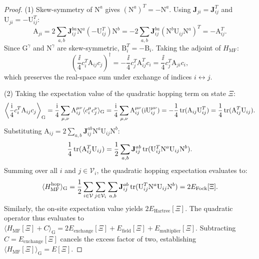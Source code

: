 \begin{proof}
(1) Skew-symmetry of $\mathrm{N}^a$ gives $(\mathrm{N}^a)^T = -\mathrm{N}^a$. Using $\mathbf{J}_{ji} = \mathbf{J}_{ij}^T$ and $\mathrm{U}_{ji} = -\mathrm{U}_{ij}^T$:
\begin{equation}
\mathrm{A}_{ji} = 2 \sum_{a,b} \mathbf{J}_{ij}^{ba} \mathrm{N}^a (-\mathrm{U}_{ij}^T) \mathrm{N}^b = -2 \sum_{a,b} \mathbf{J}_{ij}^{ba} (\mathrm{N}^b \mathrm{U}_{ij} \mathrm{N}^a)^T = -\mathrm{A}_{ij}^T.
\end{equation}
Since $\mathrm{G}^\gamma$ and $\mathrm{N}^\gamma$ are skew-symmetric, $\mathrm{B}_i^T = -\mathrm{B}_i$. Taking the adjoint of $H_{\mathrm{MF}}$:
\begin{equation}
\left( \frac{\ii}{4} c_i^T \mathrm{A}_{ij} c_j \right)^\dagger = -\frac{\ii}{4} c_j^T \mathrm{A}_{ij}^T c_i = \frac{\ii}{4} c_j^T \mathrm{A}_{ji} c_i,
\end{equation}
which preserves the real-space sum under exchange of indices $i \leftrightarrow j$.

(2) Taking the expectation value of the quadratic hopping term on state $\Xi$:
\begin{equation}
\left\langle \frac{\mathrm{i}}{4} c_i^T \mathrm{A}_{ij} c_j \right\rangle_{\mathrm{G}} = \frac{\mathrm{i}}{4} \sum_{\mu,\nu} \mathrm{A}_{ij}^{\mu\nu} \langle c_i^\mu c_j^\nu \rangle_{\mathrm{G}} = \frac{\mathrm{i}}{4} \sum_{\mu,\nu} \mathrm{A}_{ij}^{\mu\nu} (\mathrm{i} \mathrm{U}_{ij}^{\mu\nu}) = -\frac{1}{4} \operatorname{tr}(\mathrm{A}_{ij} \mathrm{U}_{ij}^T) = \frac{1}{4} \operatorname{tr}(\mathrm{A}_{ij}^T \mathrm{U}_{ij}).
\end{equation}
Substituting $\mathrm{A}_{ij} = 2 \sum_{a,b} \mathbf{J}_{ij}^{ab} \mathrm{N}^a \mathrm{U}_{ij} \mathrm{N}^b$:
\begin{equation}
\frac{1}{4} \operatorname{tr}(\mathrm{A}_{ij}^T \mathrm{U}_{ij}) = \frac{1}{2} \sum_{a,b} \mathbf{J}_{ij}^{ab} \operatorname{tr}(\mathrm{U}_{ij}^T \mathrm{N}^a \mathrm{U}_{ij} \mathrm{N}^b).
\end{equation}
Summing over all $i$ and $j \in \mathcal{V}_i$, the quadratic hopping expectation evaluates to:
\begin{equation}
\langle H_{\mathrm{MF}}^{\mathrm{hop}} \rangle_{\mathrm{G}} = \frac{1}{2} \sum_{i \in \mathcal{V}} \sum_{j \in \mathcal{V}_i} \sum_{a,b} \mathbf{J}_{ij}^{ab} \operatorname{tr}(\mathrm{U}_{ij}^T \mathrm{N}^a \mathrm{U}_{ij} \mathrm{N}^b) = 2 E_{\mathrm{Fock}}[\Xi].
\end{equation}
Similarly, the on-site expectation value yields $2 E_{\mathrm{Hartree}}[\Xi]$. The quadratic operator thus evaluates to $\langle H_{\mathrm{MF}}[\Xi] + C \rangle_{\mathrm{G}} = 2 E_{\mathrm{exchange}}[\Xi] + E_{\mathrm{field}}[\Xi] + E_{\mathrm{multiplier}}[\Xi]$. Subtracting $C = E_{\mathrm{exchange}}[\Xi]$ cancels the excess factor of two, establishing $\langle H_{\mathrm{MF}}[\Xi] \rangle_{\mathrm{G}} = E[\Xi]$.


\end{proof}
